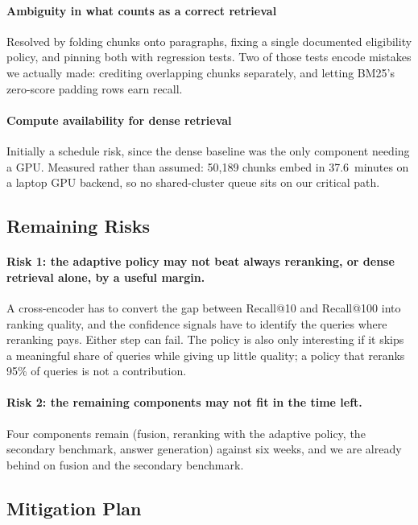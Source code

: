 \documentclass[sigconf,nonacm]{acmart}
\begin{document}
\paragraph{Ambiguity in what counts as a correct retrieval} Resolved by folding
chunks onto paragraphs, fixing a single documented eligibility policy, and
pinning both with regression tests. Two of those tests encode mistakes we
actually made: crediting overlapping chunks separately, and letting BM25's
zero-score padding rows earn recall.

\paragraph{Compute availability for dense retrieval} Initially a schedule risk,
since the dense baseline was the only component needing a GPU. Measured rather
than assumed: 50{,}189 chunks embed in 37.6~minutes on a laptop GPU backend, so
no shared-cluster queue sits on our critical path.

\subsection{Remaining Risks}

\paragraph{Risk 1: the adaptive policy may not beat always reranking, or dense
retrieval alone, by a useful margin.} A cross-encoder has to convert the gap
between Recall@10 and Recall@100 into ranking quality, and the confidence signals
have to identify the queries where reranking pays. Either step can fail. The policy is
also only interesting if it skips a meaningful share of queries while giving up
little quality; a policy that reranks 95\% of queries is not a contribution.

\paragraph{Risk 2: the remaining components may not fit in the time left.} Four
components remain (fusion, reranking with the adaptive policy, the secondary
benchmark, answer generation) against six weeks, and we are already behind on
fusion and the secondary benchmark.

\subsection{Mitigation Plan}
\end{document}
